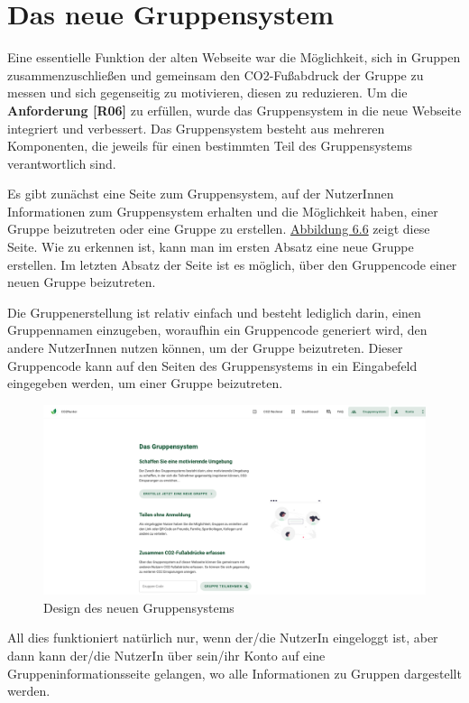 \section{Das neue Gruppensystem}

Eine essentielle Funktion der alten Webseite war die Möglichkeit, sich in Gruppen zusammenzuschließen und gemeinsam den CO2-Fußabdruck der Gruppe zu messen und sich gegenseitig zu motivieren, diesen zu reduzieren. Um die \textbf{Anforderung [R06]} zu erfüllen, wurde das Gruppensystem in die neue Webseite integriert und verbessert. Das Gruppensystem besteht aus mehreren Komponenten, die jeweils für einen bestimmten Teil des Gruppensystems verantwortlich sind.

Es gibt zunächst eine Seite zum Gruppensystem, auf der NutzerInnen Informationen zum Gruppensystem erhalten und die Möglichkeit haben, einer Gruppe beizutreten oder eine Gruppe zu erstellen. \hyperref[fig:gruppensystem-neues-design]{Abbildung 6.6} zeigt diese Seite. Wie zu erkennen ist, kann man im ersten Absatz eine neue Gruppe erstellen. Im letzten Absatz der Seite ist es möglich, über den Gruppencode einer neuen Gruppe beizutreten.

Die Gruppenerstellung ist relativ einfach und besteht lediglich darin, einen Gruppennamen einzugeben, woraufhin ein Gruppencode generiert wird, den andere NutzerInnen nutzen können, um der Gruppe beizutreten. Dieser Gruppencode kann auf den Seiten des Gruppensystems in ein Eingabefeld eingegeben werden, um einer Gruppe beizutreten.

\begin{figure}[H]
    \centering
    \includegraphics[width=1\textwidth]{images/06/gruppensystem-design.png}
    \caption{Design des neuen Gruppensystems}
    \label{fig:gruppensystem-neues-design}
\end{figure}

All dies funktioniert natürlich nur, wenn der/die NutzerIn eingeloggt ist, aber dann kann der/die NutzerIn über sein/ihr Konto auf eine Gruppeninformationsseite gelangen, wo alle Informationen zu Gruppen dargestellt werden.

